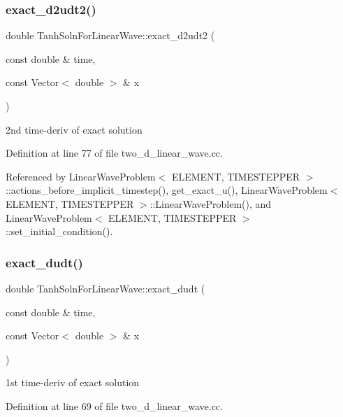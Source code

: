 \subsubsection{\texorpdfstring{exact\+\_\+d2udt2()}{exact\_d2udt2()}}
{\footnotesize\ttfamily double Tanh\+Soln\+For\+Linear\+Wave\+::exact\+\_\+d2udt2 (\begin{DoxyParamCaption}\item[{const double \&}]{time,  }\item[{const Vector$<$ double $>$ \&}]{x }\end{DoxyParamCaption})}



2nd time-\/deriv of exact solution 



Definition at line 77 of file two\+\_\+d\+\_\+linear\+\_\+wave.\+cc.



Referenced by Linear\+Wave\+Problem$<$ E\+L\+E\+M\+E\+N\+T, T\+I\+M\+E\+S\+T\+E\+P\+P\+E\+R $>$\+::actions\+\_\+before\+\_\+implicit\+\_\+timestep(), get\+\_\+exact\+\_\+u(), Linear\+Wave\+Problem$<$ E\+L\+E\+M\+E\+N\+T, T\+I\+M\+E\+S\+T\+E\+P\+P\+E\+R $>$\+::\+Linear\+Wave\+Problem(), and Linear\+Wave\+Problem$<$ E\+L\+E\+M\+E\+N\+T, T\+I\+M\+E\+S\+T\+E\+P\+P\+E\+R $>$\+::set\+\_\+initial\+\_\+condition().

\mbox{\label{namespaceTanhSolnForLinearWave_aa2081bd3d3d518a38497f664b0e498bc}} 
\subsubsection{\texorpdfstring{exact\+\_\+dudt()}{exact\_dudt()}}
{\footnotesize\ttfamily double Tanh\+Soln\+For\+Linear\+Wave\+::exact\+\_\+dudt (\begin{DoxyParamCaption}\item[{const double \&}]{time,  }\item[{const Vector$<$ double $>$ \&}]{x }\end{DoxyParamCaption})}



1st time-\/deriv of exact solution 



Definition at line 69 of file two\+\_\+d\+\_\+linear\+\_\+wave.\+cc.



